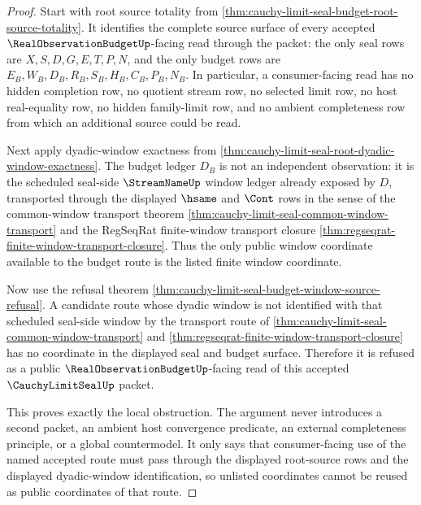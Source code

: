 \begin{proof}
Start with root source totality from \autoref{thm:cauchy-limit-seal-budget-root-source-totality}. It identifies the complete source surface of every accepted $\RealObservationBudgetUp$-facing read through the packet: the only seal rows are $X,S,D,G,E,T,P,N$, and the only budget rows are $E_B,W_B,D_B,R_B,S_B,H_B,C_B,P_B,N_B$. In particular, a consumer-facing read has no hidden completion row, no quotient stream row, no selected limit row, no host real-equality row, no hidden family-limit row, and no ambient completeness row from which an additional source could be read.

Next apply dyadic-window exactness from \autoref{thm:cauchy-limit-seal-root-dyadic-window-exactness}. The budget ledger $D_B$ is not an independent observation: it is the scheduled seal-side $\StreamNameUp$ window ledger already exposed by $D$, transported through the displayed $\hsame$ and $\Cont$ rows in the sense of the common-window transport theorem \autoref{thm:cauchy-limit-seal-common-window-transport} and the RegSeqRat finite-window transport closure \autoref{thm:regseqrat-finite-window-transport-closure}. Thus the only public window coordinate available to the budget route is the listed finite window coordinate.

Now use the refusal theorem \autoref{thm:cauchy-limit-seal-budget-window-source-refusal}. A candidate route whose dyadic window is not identified with that scheduled seal-side window by the transport route of \autoref{thm:cauchy-limit-seal-common-window-transport} and \autoref{thm:regseqrat-finite-window-transport-closure} has no coordinate in the displayed seal and budget surface. Therefore it is refused as a public $\RealObservationBudgetUp$-facing read of this accepted $\CauchyLimitSealUp$ packet.

This proves exactly the local obstruction. The argument never introduces a second packet, an ambient host convergence predicate, an external completeness principle, or a global countermodel. It only says that consumer-facing use of the named accepted route must pass through the displayed root-source rows and the displayed dyadic-window identification, so unlisted coordinates cannot be reused as public coordinates of that route.
\end{proof}
